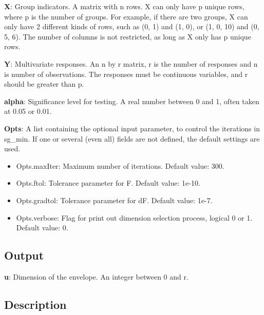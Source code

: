 \documentclass[a4paper,11pt,openany]{memoir}
\begin{document}
\begin{par}
\textbf{X}: Group indicators. A matrix with n rows.  X can only have p unique  rows, where p is the number of groups. For example, if there are two groups, X can only have 2 different kinds of rows, such as (0, 1) and (1, 0), or (1, 0, 10) and (0, 5, 6).  The number of columns is not restricted, as long as X only has p unique rows.
\end{par} \vspace{1em}
\begin{par}
\textbf{Y}: Multivariate responses. An n by r matrix, r is the number of responses and n is number of observations. The responses must be continuous variables, and r should be greater than p.
\end{par} \vspace{1em}
\begin{par}
\textbf{alpha}: Significance level for testing.  A real number between 0 and 1, often taken at 0.05 or 0.01.
\end{par} \vspace{1em}
\begin{par}
\textbf{Opts}: A list containing the optional input parameter, to control the iterations in sg\_min. If one or several (even all) fields are not defined, the default settings are used.
\end{par} \vspace{1em}
\begin{itemize}
\setlength{\itemsep}{-1ex}
   \item Opts.maxIter: Maximum number of iterations.  Default value: 300.
   \item Opts.ftol: Tolerance parameter for F.  Default value: 1e-10.
   \item Opts.gradtol: Tolerance parameter for dF.  Default value: 1e-7.
   \item Opts.verbose: Flag for print out dimension selection process, logical 0 or 1. Default value: 0.
\end{itemize}


\subsection*{Output}

\begin{par}
\textbf{u}: Dimension of the envelope. An integer between 0 and r.
\end{par} \vspace{1em}


\subsection*{Description}
\end{document}
